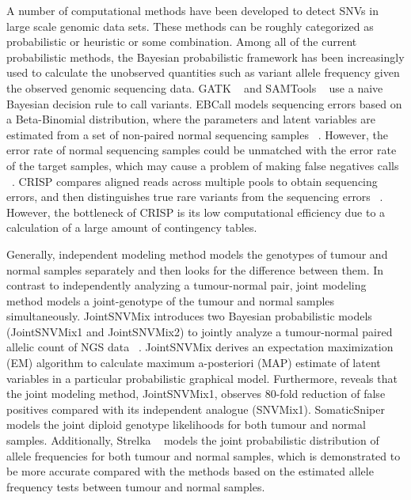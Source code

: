 \documentclass[11pt,reqno]{amsart}
\begin{document}
A number of computational methods have been developed to detect SNVs in large scale genomic data sets.
These methods can be roughly categorized as probabilistic or heuristic or some combination.
Among all of the current probabilistic methods, the Bayesian probabilistic framework has been increasingly used to calculate the unobserved quantities such as variant allele frequency given the observed genomic sequencing data.
GATK ~\citep{mckenna2010genome} and SAMTools ~\citep{li2009sequence} use a naive Bayesian decision rule to call variants.
EBCall models sequencing errors based on a Beta-Binomial distribution, where the parameters and latent variables are estimated from a set of non-paired normal sequencing samples ~\citep{shiraishi2013empirical}.
However, the error rate of normal sequencing samples could be unmatched with the error rate of the target samples, which may cause a problem of making false negatives calls ~\citep{wang2013detecting}.
CRISP compares aligned reads across multiple pools to obtain sequencing errors, and then distinguishes true rare variants from the sequencing errors ~\citep{bansal2010statistical}.
However, the bottleneck of CRISP is its low computational efficiency due to a calculation of a large amount of contingency tables.

Generally, independent modeling method models the genotypes of tumour and normal samples separately and then looks for the difference between them.
In contrast to independently analyzing a tumour-normal pair, joint modeling method models a joint-genotype of the tumour and normal samples simultaneously.
JointSNVMix introduces two Bayesian probabilistic models (JointSNVMix1 and JointSNVMix2) to jointly analyze a tumour-normal paired allelic count of NGS data ~\citep{roth2012jointsnvmix}.
JointSNVMix derives an expectation maximization (EM) algorithm to calculate maximum a-posteriori (MAP) estimate of latent variables in a particular probabilistic graphical model.
Furthermore, \citet{roth2012jointsnvmix} reveals that the joint modeling method, JointSNVMix1, observes 80-fold reduction of false positives compared with its independent analogue (SNVMix1).
SomaticSniper ~\citep{larson2012somaticsniper} models the joint diploid genotype likelihoods for both tumour and normal samples.
Additionally, Strelka ~\citep{saunders2012strelka} models the joint probabilistic distribution of allele frequencies for both tumour and normal samples, which is demonstrated to be more accurate compared with the methods based on the estimated allele frequency tests between tumour and normal samples.
\end{document}
